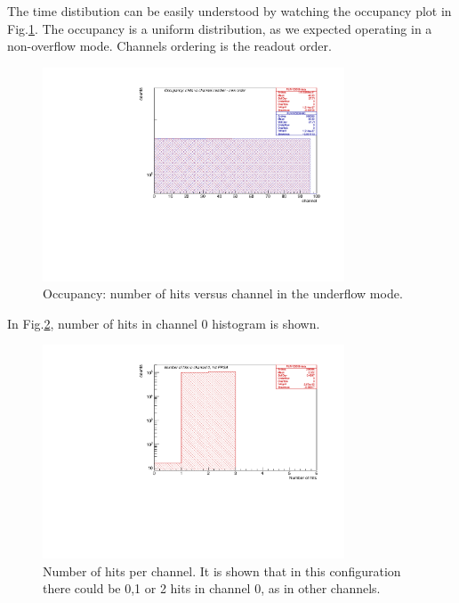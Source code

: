 The time distibution can be easily understood by watching the occupancy plot in Fig.\ref{fig:5}. The occupancy is a uniform distribution, as we expected operating in a non-overflow mode. Channels ordering is the readout order.
\begin{figure}[H]
\centering
\includegraphics[width =0.8\textwidth]{figures/pdf/figure_00002_nhitsvschannel_roc_simulation_2}
\caption{Occupancy: number of hits versus channel in the underflow mode.}
\label{fig:5}
\end{figure}


In Fig.\ref{fig:67}, number of hits in channel 0 histogram is shown.
\begin{figure}[H]
\centering
\includegraphics[width =0.8\textwidth]{figures/pdf/figure_00067_nhits_ch00_run105038.pdf}
\caption{Number of hits per channel. It is shown that in this configuration there could be 0,1 or 2 hits in channel 0, as in other channels.}
\label{fig:67}
\end{figure}

